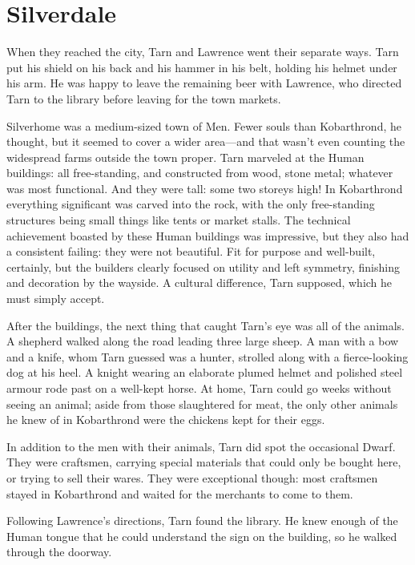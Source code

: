 \chapter{Silverdale}

When they reached the city, Tarn and Lawrence went their separate ways.  Tarn put his shield on his back and his hammer in his belt, holding his helmet under his arm.  He was happy to leave the remaining beer with Lawrence, who directed Tarn to the library before leaving for the town markets.

Silverhome was a medium-sized town of Men.  Fewer souls than Kobarthrond, he thought, but it seemed to cover a wider area---and that wasn't even counting the widespread farms outside the town proper.  Tarn marveled at the Human buildings: all free-standing, and constructed from wood, stone metal; whatever was most functional.  And they were tall: some two storeys high!  In Kobarthrond everything significant was carved into the rock, with the only free-standing structures being small things like tents or market stalls.  The technical achievement boasted by these Human buildings was impressive, but they also had a consistent failing: they were not beautiful.  Fit for purpose and well-built, certainly, but the builders clearly focused on utility and left symmetry, finishing and decoration by the wayside.  A cultural difference, Tarn supposed, which he must simply accept.

After the buildings, the next thing that caught Tarn's eye was all of the animals.  A shepherd walked along the road leading three large sheep. A man with a bow and a knife, whom Tarn guessed was a hunter, strolled along with a fierce-looking dog at his heel.  A knight wearing an elaborate plumed helmet and polished steel armour rode past on a well-kept horse.  At home, Tarn could go weeks without seeing an animal; aside from those slaughtered for meat, the only other animals he knew of in Kobarthrond were the chickens kept for their eggs.

In addition to the men with their animals, Tarn did spot the occasional Dwarf.  They were craftsmen, carrying special materials that could only be bought here, or trying to sell their wares.  They were exceptional though: most craftsmen stayed in Kobarthrond and waited for the merchants to come to them.

Following Lawrence's directions, Tarn found the library.  He knew enough of the Human tongue that he could understand the sign on the building, so he walked through the doorway.

